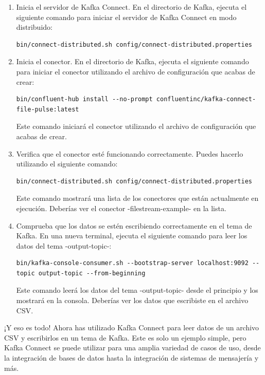 \documentclass{article}
\begin{document}
\begin{enumerate}
\item Inicia el servidor de Kafka Connect. En el directorio de Kafka, ejecuta el siguiente comando para iniciar el servidor de Kafka Connect en modo distribuido:
\begin{lstlisting}[numbers=none]
bin/connect-distributed.sh config/connect-distributed.properties
\end{lstlisting}

\item Inicia el conector. En el directorio de Kafka, ejecuta el siguiente comando para iniciar el conector utilizando el archivo de configuración que acabas de crear:
\begin{lstlisting}[numbers=none]
bin/confluent-hub install --no-prompt confluentinc/kafka-connect-file-pulse:latest
\end{lstlisting}
Este comando iniciará el conector utilizando el archivo de configuración que acabas de crear.

\item Verifica que el conector esté funcionando correctamente. Puedes hacerlo utilizando el siguiente comando:
\begin{lstlisting}[numbers=none]
bin/connect-distributed.sh config/connect-distributed.properties
\end{lstlisting}
Este comando mostrará una lista de los conectores que están actualmente en ejecución. Deberías ver el conector -filestream-example- en la lista.

\item Comprueba que los datos se estén escribiendo correctamente en el tema de Kafka. En una nueva terminal, ejecuta el siguiente comando para leer los datos del tema -output-topic-:
\begin{lstlisting}[numbers=none]
bin/kafka-console-consumer.sh --bootstrap-server localhost:9092 --topic output-topic --from-beginning
\end{lstlisting}
Este comando leerá los datos del tema -output-topic- desde el principio y los mostrará en la consola. Deberías ver los datos que escribiste en el archivo CSV.
\end{enumerate}

¡Y eso es todo! Ahora has utilizado Kafka Connect para leer datos de un archivo CSV y escribirlos en un tema de Kafka. Este es solo un ejemplo simple, pero Kafka Connect se puede utilizar para una amplia variedad de casos de uso, desde la integración de bases de datos hasta la integración de sistemas de mensajería y más.
\end{document}
